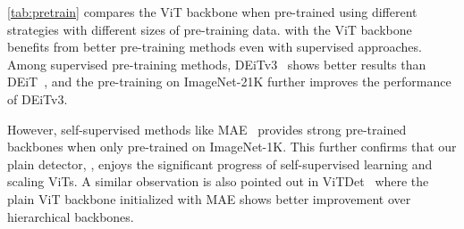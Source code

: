    \cref{tab:pretrain} compares the ViT backbone when pre-trained using different strategies with different sizes of pre-training data. \ours with the ViT backbone benefits from better pre-training methods even with supervised approaches. Among supervised pre-training methods, DEiTv3~\citep{touvron2022deit3} shows better results than DEiT~\citep{touvron2021deit}, and the pre-training on ImageNet-21K further improves the performance of DEiTv3.
  
  However, self-supervised methods like MAE~\citep{he2022mae} provides strong pre-trained backbones when only pre-trained on ImageNet-1K. This further confirms that our plain detector, \ours, enjoys the significant progress of self-supervised learning and scaling ViTs. A similar observation is also pointed out in ViTDet~\citep{li2022vitdet} where the plain ViT backbone initialized with MAE shows better improvement over hierarchical backbones.
  
  